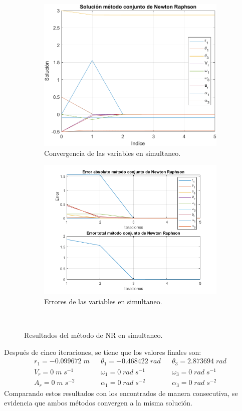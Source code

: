 \documentclass[12pt]{article}
\begin{document}
\begin{figure}[H]
\centering
  \begin{subfigure}[b]{0.49\textwidth}
    \includegraphics[width=7 cm, height=7 cm, keepaspectratio]{Implementacion/solucion NR conjunto.png}
    \caption{Convergencia de las variables en simultaneo.}
    \label{}
  \end{subfigure}
  \hfill
  \begin{subfigure}[b]{0.49\textwidth}
    \includegraphics[width=7.5 cm, height=7.5 cm, keepaspectratio]{Implementacion/error NR conjunto.png}
    \caption{Errores de las variables en simultaneo.}
    \label{}
  \end{subfigure}\\
        \vspace{10pt}
  \caption{Resultados del método de NR en simultaneo.}
\end{figure}
Después de cinco iteraciones, se tiene que los valores finales son:
\begin{align*}
r_1=-0.099672\;m&&\theta_1=-0.468422\;rad&&\theta_3=2.873694\;rad\\
V_r=0\;m\;s^{-1}&&\omega_1=0\;rad\;s^{-1}&&\omega_3=0\;rad\;s^{-1}\\
A_r=0\;m\;s^{-2}&&\alpha_1=0\;rad\;s^{-2}&&\alpha_3=0\;rad\;s^{-2}
\end{align*}
Comparando estos resultados con los encontrados de manera consecutiva, se evidencia que ambos métodos convergen a la misma solución.
\end{document}
